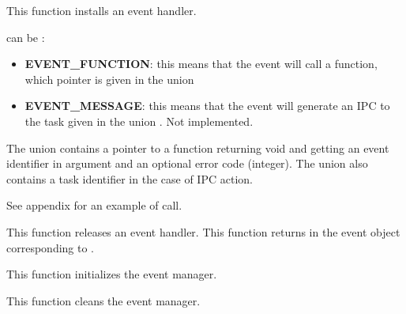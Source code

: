 	 {
	   This function installs an event handler.

	    can be :
	   \begin{itemize}
	     \item
	       \textbf{EVENT\_FUNCTION}: this means that the event will
	       call a function, which pointer is given in the union
	     \item
	       \textbf{EVENT\_MESSAGE}: this means that the event will
	       generate an IPC to the task given in the union
	       . Not implemented.
	   \end{itemize}

	   The union  contains a pointer to a
	   function returning void and getting an event identifier in
	   argument and an optional error code (integer). The union
	   also contains a task identifier in the case of IPC action.

	   See appendix for an example of call.
	 }

	 {
	   This function releases an event handler.
	 }
\newpage
{}
	 {
	   This function returns in  the event object
	   corresponding to .
	 }

	 {
	   This function initializes the event manager.
	 }

	 {
	   This function cleans the event manager.
	 }


%
%

\newpage

